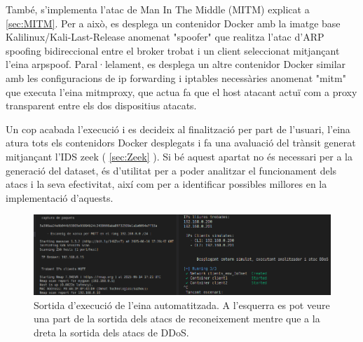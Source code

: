 També, s'implementa l'atac de Man In The Middle (MITM) explicat a \ref{sec:MITM}. Per a això, es desplega un contenidor Docker amb la imatge base Kalilinux/Kali-Last-Release anomenat "spoofer" que realitza l'atac d'ARP spoofing bidireccional entre el broker trobat i un client seleccionat mitjançant l'eina arpspoof. Paral·lelament, es desplega un altre contenidor Docker similar amb les configuracions de ip forwarding i iptables necessàries anomenat "mitm" que executa l'eina mitmproxy, que actua fa que el host atacant actuï com a proxy transparent entre els dos dispositius atacats.

Un cop acabada l'execució i es decideix al finalització per part de l'usuari, l'eina atura tots els contenidors Docker desplegats i fa una avaluació del trànsit generat mitjançant l'IDS zeek ( \ref{sec:Zeek} ). Si bé aquest apartat no és necessari per a la generació del dataset, és d'utilitat per a poder analitzar el funcionament dels atacs i la seva efectivitat, així com per a identificar possibles millores en la implementació d'aquests.

  \begin{figure}[H]
    \centering
    \includegraphics[width=1\textwidth]{img/tool.png}
    \caption{Sortida d'execució de l'eina automatitzada. A l'esquerra es pot veure una part de la sortida dels atacs de reconeixement mentre que a la dreta la sortida dels atacs de DDoS.}
    \label{fig:tool}
  \end{figure}


\